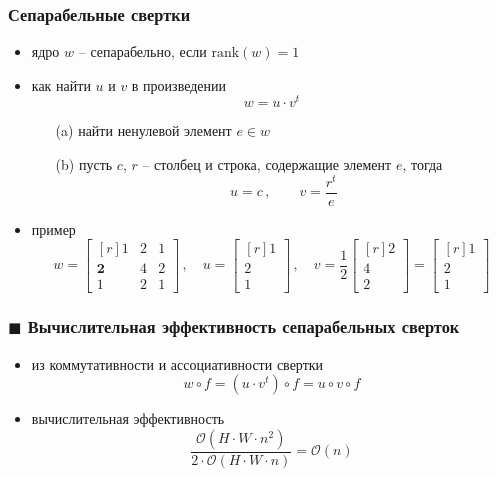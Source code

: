 \documentclass[
    12pt, 
    usepdftitle=false,
    aspectratio=1610
]{beamer}
\begin{document}
\begin{frame}
\frametitle{Сепарабельные свертки}
\begin{itemize}
    \item ядро $w$ -- сепарабельно, если $\mathrm{rank}(w)=1$ 
    \item как найти $u$ и $v$ в произведении
    $$
        w = u \cdot v^t
    $$
    \begin{enumerate}
        \item[(a)] найти ненулевой элемент $e\in w$
        \item[(b)] пусть $c$, $r$ -- столбец и строка, содержащие элемент $e$, тогда
        $$
            u = c\,,\qquad
            v = \frac{r^t}{e} 
        $$
    \end{enumerate}
    \item пример
        $$
            w = 
            \begin{bmatrix*}[r]
                1 & 2 & 1\\
                \mathbf{2} & 4 & 2\\
                1 & 2 & 1
            \end{bmatrix*}\,,\quad
            u =
            \begin{bmatrix*}[r]
                1 \\ 2\\ 1
            \end{bmatrix*}\,,\quad
            v = \frac{1}{2}
            \begin{bmatrix*}[r]
                2 \\ 4 \\ 2
            \end{bmatrix*}=
            \begin{bmatrix*}[r]
                1 \\ 2 \\ 1
            \end{bmatrix*}
        $$
\end{itemize}
\end{frame}

\begin{frame}
\frametitle{$\blacksquare$ Вычислительная эффективность сепарабельных сверток}
\begin{itemize}
    \item из коммутативности и ассоциативности свертки
    $$
        w\circ f = \left(u \cdot v^t\right)\circ f=u\circ v \circ f
    $$ 
    \item вычислительная эффективность
    $$
        \frac{\mathcal{O}\left(H\cdot W\cdot n^2\right)}{2\cdot\mathcal{O}\left(H\cdot W\cdot n\right)}=\mathcal{O}(n)
    $$
\end{itemize}
\end{frame}
\end{document}
